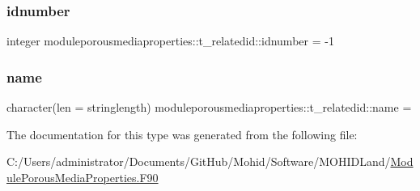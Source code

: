 \subsubsection{\texorpdfstring{idnumber}{idnumber}}
{\footnotesize\ttfamily integer moduleporousmediaproperties\+::t\+\_\+relatedid\+::idnumber = -\/1\hspace{0.3cm}{\ttfamily [private]}}

\mbox{\label{structmoduleporousmediaproperties_1_1t__relatedid_a9b57cfca7d90b2b423b8bccd8674f20a}} 
\subsubsection{\texorpdfstring{name}{name}}
{\footnotesize\ttfamily character(len = stringlength) moduleporousmediaproperties\+::t\+\_\+relatedid\+::name = \textquotesingle{}\textquotesingle{}\hspace{0.3cm}{\ttfamily [private]}}



The documentation for this type was generated from the following file\+:\begin{DoxyCompactItemize}
\item 
C\+:/\+Users/administrator/\+Documents/\+Git\+Hub/\+Mohid/\+Software/\+M\+O\+H\+I\+D\+Land/\mbox{\hyperlink{_module_porous_media_properties_8_f90}{Module\+Porous\+Media\+Properties.\+F90}}\end{DoxyCompactItemize}
